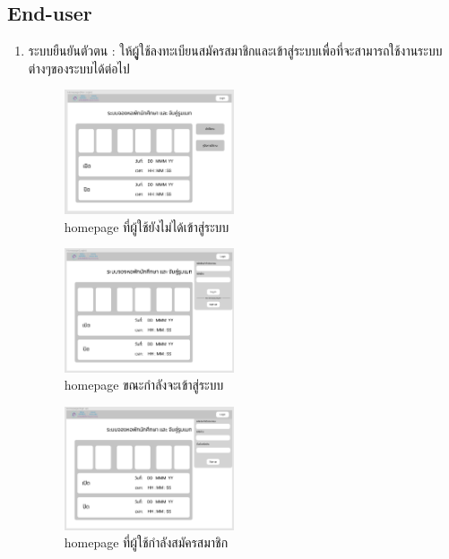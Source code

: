 \subsection{End-user}
\begin{enumerate}
  \item ระบบยืนยันตัวตน : ให้ผูู้ใช้ลงทะเบียนสมัครสมาชิกและเข้าสู่ระบบเพื่อที่จะสามารถใช้งานระบบต่างๆของระบบได้ต่อไป
  \begin{figure}[h]
  \begin{center}
  \includegraphics[width=50mm,scale=0.5]{photo/homepageNoAuth.png}
  \end{center}
  \caption{homepage ที่ผู้ใช้ยังไม่ได้เข้าสู่ระบบ}
  \label{fig:hp-no-auth}
  \end{figure}

  \begin{figure}[h]
  \begin{center}
  \includegraphics[width=50mm,scale=0.5]{photo/homepageLogin.png}
  \end{center}
  \caption{homepage ขณะกำลังจะเข้าสู่ระบบ}
  \label{fig:hp-login}
  \end{figure}

  \begin{figure}[h]
  \begin{center}
  \includegraphics[width=50mm,scale=0.5]{photo/homepageReg.png}
  \end{center}
  \caption{homepage ที่ผู้ใช้กำลังสมัครสมาชิก}
  \label{fig:hp-reg}
  \end{figure}


\end{enumerate}
